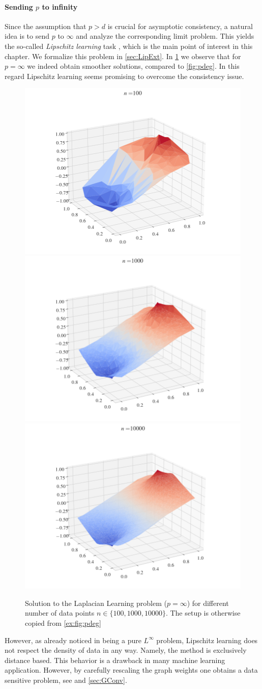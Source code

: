 \paragraph{Sending $p$ to infinity} 

Since the assumption that $p>d$ is crucial for asymptotic consistency, a natural idea is to send $p$ to $\infty$ and analyze the corresponding limit problem. This yields the so-called \emph{Lipschitz learning} task \cite{von2004distance, kyng2015algorithms}, which is the main point of interest in this chapter. We formalize this problem in \cref{sec:LipExt}. In \cref{fig:pinf} we observe that for $p=\infty$ we indeed obtain smoother solutions, compared to \cref{fig:pdeg}. In this regard Lipschitz learning seems promising to overcome the consistency issue.

\begin{figure}
\includegraphics[width=.28\textwidth, trim={3.1cm 1cm 3.5cm 0cm},clip]{code/SSL/2Dex_100-p=inf.png}%
\hfill%
\includegraphics[width=.28\textwidth,trim={3.1cm 1cm 3.5cm 0cm},clip]{code/SSL/2Dex_1000-p=inf.png}%
\hfill%
\includegraphics[width=.28\textwidth,trim={3.1cm 1cm 3.5cm 0cm},clip]{code/SSL/2Dex_10000-p=inf.png}%
%
\caption{Solution to the Laplacian Learning problem ($p=\infty$) for different number of data points $n\in\{100,1000,10000\}$. The setup is otherwise copied from \cref{ex:fig:pdeg}}\label{fig:pinf}
\end{figure}
%
However, as already noticed in \cite{el2016asymptotic} being a pure $L^\infty$ problem, Lipschitz learning does not respect the density of data in any way. Namely, the method is exclusively distance based. This behavior is a drawback in many machine learning application. However, by carefully rescaling the graph weights one obtains a data sensitive problem, see \cite{calder2019consistency} and \cref{sec:GConv}.

